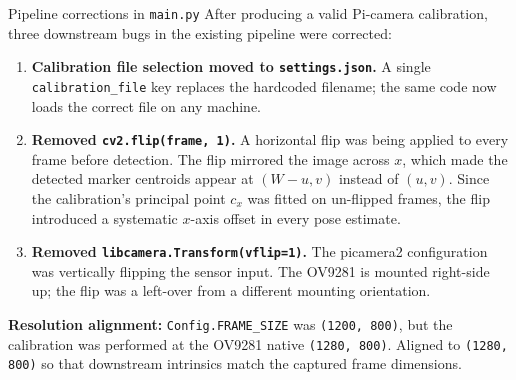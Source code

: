 \documentclass[10pt,aspectratio=169]{beamer}
\begin{document}
\begin{frame}{Pipeline corrections in \texttt{main.py}}
After producing a valid Pi-camera calibration, three downstream bugs in the existing pipeline were corrected:

\begin{enumerate}
    \item \textbf{Calibration file selection moved to \texttt{settings.json}.} A single \texttt{calibration\_file} key replaces the hardcoded filename; the same code now loads the correct file on any machine.
    \item \textbf{Removed \texttt{cv2.flip(frame, 1)}.} A horizontal flip was being applied to every frame before detection. The flip mirrored the image across $x$, which made the detected marker centroids appear at $(W - u, v)$ instead of $(u, v)$. Since the calibration's principal point $c_x$ was fitted on un-flipped frames, the flip introduced a systematic $x$-axis offset in every pose estimate.
    \item \textbf{Removed \texttt{libcamera.Transform(vflip=1)}.} The picamera2 configuration was vertically flipping the sensor input. The OV9281 is mounted right-side up; the flip was a left-over from a different mounting orientation.
\end{enumerate}

\textbf{Resolution alignment:} \texttt{Config.FRAME\_SIZE} was \texttt{(1200, 800)}, but the calibration was performed at the OV9281 native \texttt{(1280, 800)}. Aligned to \texttt{(1280, 800)} so that downstream intrinsics match the captured frame dimensions.
\end{frame}
\end{document}
